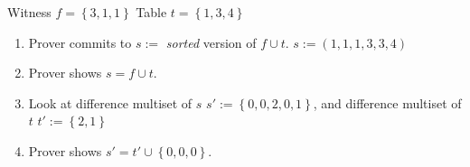 \documentclass[shadesubsections,compress,14pt,mathserif]{beamer}
\newcommand{\set}[1]{\ensuremath{\left\{#1\right\}}}
\newcommand{\defeq}{\ensuremath{:=}}
\begin{document}
\begin{frame}

Witness $f=\set{3,1,1}$
Table $t=\set{1,3,4}$

\begin{enumerate}
 \item Prover commits to $s\defeq$ \emph{sorted} version of $f\cup t$. $s\defeq (1,1,1,3,3,4)$  \pause
 \item Prover shows $s=f\cup t$. \pause
 \item Look at difference multiset of $s$ $s'\defeq \set{0,0,2,0,1}$, and difference multiset of $t$ $t'\defeq \set{2,1}$\pause
 \item Prover shows $s'=t'\cup \set{0,0,0}$.
\end{enumerate}

\end{frame}
% 
%  
% 




%  






\end{document}
